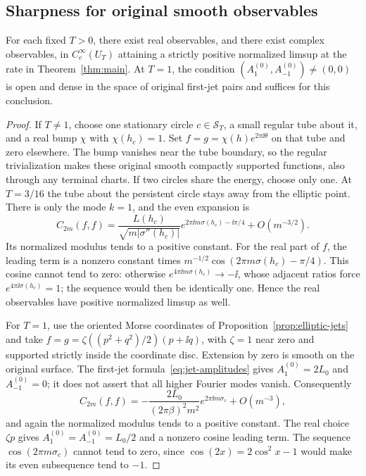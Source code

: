 \subsection{Sharpness for original smooth observables}

\begin{proposition}\label{prop:sharpness}
For each fixed \(T>0\), there exist real observables, and there exist
complex observables, in \(C_c^\infty(U_T)\) attaining a strictly positive
normalized limsup at the rate in Theorem~\ref{thm:main}. At \(T=1\), the condition
\((A_1^{(0)},A_{-1}^{(0)})\ne(0,0)\) is open and dense in the space of
original first-jet pairs and suffices for this conclusion.
\end{proposition}

\begin{proof}
If \(T\ne1\), choose one stationary circle \(c\in\mathcal S_T\), a small
regular tube about it, and a real bump \(\chi\) with \(\chi(h_c)=1\).
Set \(f=g=\chi(h)e^{2\pi\ii\theta}\) on that tube and zero elsewhere.
The bump vanishes near the tube boundary, so the regular trivialization
makes these original smooth compactly supported functions, also through
any terminal charts. If two circles share the energy, choose only one.
At \(T=3/16\) the tube about the persistent circle stays away from the
elliptic point. There is only the mode \(k=1\), and the even expansion is
\[
 C_{2m}(f,f)=\frac{L(h_c)}{\sqrt{m|\sigma''(h_c)|}}
 e^{2\pi\ii m\sigma(h_c)-\ii\pi/4}+O(m^{-3/2}).
\]
Its normalized modulus tends to a positive constant. For the real part
of \(f\), the leading term is a nonzero constant times
\(m^{-1/2}\cos(2\pi m\sigma(h_c)-\pi/4)\).
This cosine cannot tend to zero: otherwise
\(e^{4\pi\ii m\sigma(h_c)}\to-\ii\), whose adjacent ratios force
\(e^{4\pi\ii\sigma(h_c)}=1\); the sequence would then be identically one.
Hence the real observables have positive normalized limsup as well.

For \(T=1\), use the oriented Morse coordinates of
Proposition~\ref{prop:elliptic-jets} and take
\(f=g=\zeta((p^2+q^2)/2)(p+\ii q)\), with \(\zeta=1\) near zero and
supported strictly inside the coordinate disc. Extension by zero is smooth
on the original surface. The first-jet formula~\eqref{eq:jet-amplitudes} gives
\(A_1^{(0)}=2L_0\) and \(A_{-1}^{(0)}=0\); it does not assert that all
higher Fourier modes vanish. Consequently
\[
 C_{2m}(f,f)=-\frac{2L_0}{(2\pi\beta)^2m^2}
                    e^{2\pi\ii m\sigma_c}+O(m^{-3}),
\]
and again the normalized modulus tends to a positive constant.
The real choice \(\zeta p\) gives
\(A_1^{(0)}=A_{-1}^{(0)}=L_0/2\) and a nonzero cosine leading term.
The sequence \(\cos(2\pi m\sigma_c)\) cannot tend to zero, since
\(\cos(2x)=2\cos^2x-1\) would make its even subsequence tend to \(-1\).


\end{proof}
